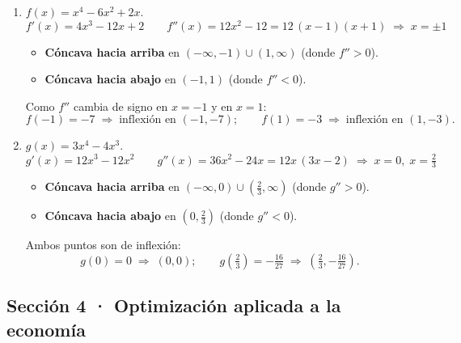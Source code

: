 \documentclass[12pt, letterpaper]{article}
\begin{document}
  \begin{enumerate}[leftmargin=*, label=\textbf{\arabic*.}]
    \item $f(x) = x^{4} - 6x^{2} + 2x$.
    \[
      f'(x) = 4x^{3} - 12x + 2
      \qquad
      f''(x) = 12x^{2} - 12 = 12\,(x - 1)(x + 1)
      \;\Longrightarrow\; x = \pm 1
    \]
    \begin{itemize}
      \item \textbf{Cóncava hacia arriba} en $(-\infty,-1) \cup (1,\infty)$ (donde $f'' > 0$).
      \item \textbf{Cóncava hacia abajo} en $(-1,1)$ (donde $f'' < 0$).
    \end{itemize}
    Como $f''$ cambia de signo en $x=-1$ y en $x=1$:
    \[
      f(-1) = -7 \;\Rightarrow\; \text{inflexión en } (-1,-7);
      \qquad
      f(1) = -3 \;\Rightarrow\; \text{inflexión en } (1,-3).
    \]

    \item $g(x) = 3x^{4} - 4x^{3}$.
    \[
      g'(x) = 12x^{3} - 12x^{2}
      \qquad
      g''(x) = 36x^{2} - 24x = 12x\,(3x - 2)
      \;\Longrightarrow\; x = 0,\; x = \tfrac{2}{3}
    \]
    \begin{itemize}
      \item \textbf{Cóncava hacia arriba} en $(-\infty,0) \cup \left(\tfrac{2}{3},\infty\right)$ (donde $g'' > 0$).
      \item \textbf{Cóncava hacia abajo} en $\left(0,\tfrac{2}{3}\right)$ (donde $g'' < 0$).
    \end{itemize}
    Ambos puntos son de inflexión:
    \[
      g(0) = 0 \;\Rightarrow\; (0,0);
      \qquad
      g\!\left(\tfrac{2}{3}\right) = -\tfrac{16}{27} \;\Rightarrow\; \left(\tfrac{2}{3}, -\tfrac{16}{27}\right).
    \]
  \end{enumerate}

  \subsection*{Sección 4 · Optimización aplicada a la economía}
\end{document}

